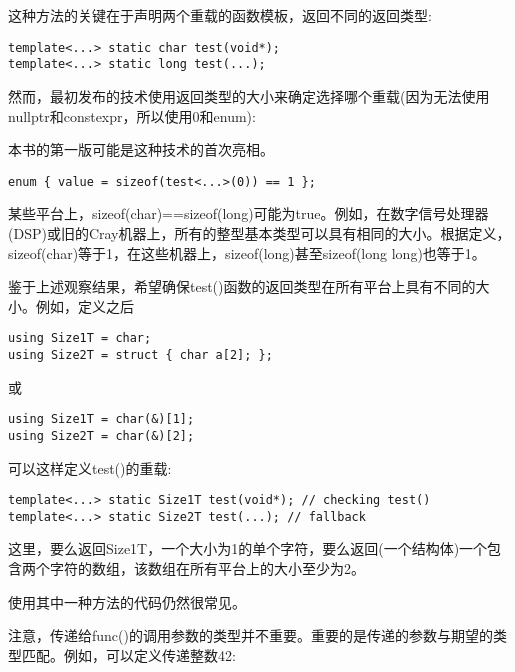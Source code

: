 这种方法的关键在于声明两个重载的函数模板，返回不同的返回类型:

\begin{lstlisting}[style=styleCXX]
template<...> static char test(void*);
template<...> static long test(...);
\end{lstlisting}

然而，最初发布的技术使用返回类型的大小来确定选择哪个重载(因为无法使用nullptr和constexpr，所以使用0和enum):

\begin{tcolorbox}[colback=webgreen!5!white,colframe=webgreen!75!black]
\hspace*{0.75cm}本书的第一版可能是这种技术的首次亮相。
\end{tcolorbox}

\begin{lstlisting}[style=styleCXX]
enum { value = sizeof(test<...>(0)) == 1 };
\end{lstlisting}

某些平台上，sizeof(char)==sizeof(long)可能为true。例如，在数字信号处理器(DSP)或旧的Cray机器上，所有的整型基本类型可以具有相同的大小。根据定义，sizeof(char)等于1，在这些机器上，sizeof(long)甚至sizeof(long long)也等于1。

鉴于上述观察结果，希望确保test()函数的返回类型在所有平台上具有不同的大小。例如，定义之后

\begin{lstlisting}[style=styleCXX]
using Size1T = char;
using Size2T = struct { char a[2]; };
\end{lstlisting}

或

\begin{lstlisting}[style=styleCXX]
using Size1T = char(&)[1];
using Size2T = char(&)[2];
\end{lstlisting}

可以这样定义test()的重载:

\begin{lstlisting}[style=styleCXX]
template<...> static Size1T test(void*); // checking test()
template<...> static Size2T test(...); // fallback
\end{lstlisting}

这里，要么返回Size1T，一个大小为1的单个字符，要么返回(一个结构体)一个包含两个字符的数组，该数组在所有平台上的大小至少为2。

使用其中一种方法的代码仍然很常见。

注意，传递给func()的调用参数的类型并不重要。重要的是传递的参数与期望的类型匹配。例如，可以定义传递整数42:

